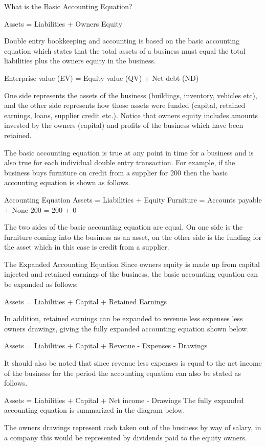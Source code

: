 \documentclass[]{book}
\theoremstyle{definition}
\theoremstyle{definition}
\theoremstyle{definition}
\theoremstyle{remark}
\begin{document}
What is the Basic Accounting Equation?

Assets = Liabilities + Owners Equity

Double entry bookkeeping and accounting is based on the basic accounting
equation which states that the total assets of a business must equal the
total liabilities plus the owners equity in the business.

Enterprise value (EV) = Equity value (QV) + Net debt (ND)

One side represents the assets of the business (buildings, inventory,
vehicles etc), and the other side represents how those assets were
funded (capital, retained earnings, loans, supplier credit etc.). Notice
that owners equity includes amounts invested by the owners (capital) and
profits of the business which have been retained.

The basic accounting equation is true at any point in time for a
business and is also true for each individual double entry transaction.
For example, if the business buys furniture on credit from a supplier
for 200 then the basic accounting equation is shown as follows.

Accounting Equation Assets = Liabilities + Equity Furniture = Accounts
payable + None 200 = 200 + 0

The two sides of the basic accounting equation are equal. On one side is
the furniture coming into the business as an asset, on the other side is
the funding for the asset which in this case is credit from a supplier.

The Expanded Accounting Equation Since owners equity is made up from
capital injected and retained earnings of the business, the basic
accounting equation can be expanded as follows:

Assets = Liabilities + Capital + Retained Earnings

In addition, retained earnings can be expanded to revenue less expenses
less owners drawings, giving the fully expanded accounting equation
shown below.

Assets = Liabilities + Capital + Revenue - Expenses - Drawings

It should also be noted that since revenue less expenses is equal to the
net income of the business for the period the accounting equation can
also be stated as follows.

Assets = Liabilities + Capital + Net income - Drawings The fully
expanded accounting equation is summarized in the diagram below.

The owners drawings represent cash taken out of the business by way of
salary, in a company this would be represented by dividends paid to the
equity owners.
\end{document}
